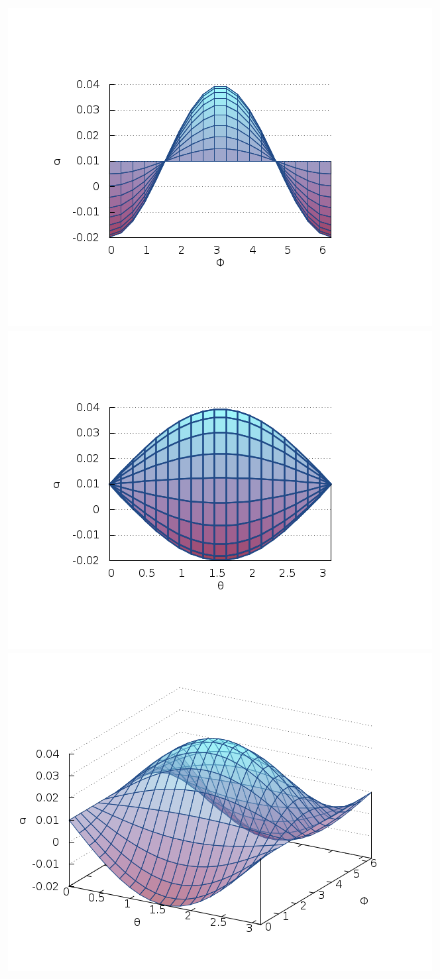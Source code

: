 \documentclass[a4paper,11pt]{exam}
\begin{document}
{	\begin{figure}[h]
		\centering
		\includegraphics[scale=0.35]{Sig2.png}
		\includegraphics[scale=0.35]{Sig3.png}
		\includegraphics[scale=0.6]{Sig1.png}
		

\end{figure}}
\end{document}
